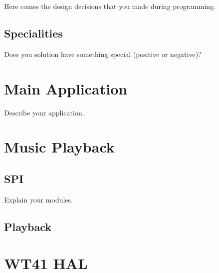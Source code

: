 \documentclass[12pt,a4paper,titlepage,oneside]{article}
\begin{document}
Here comes the design decisions that you made during programming.

\subsection{Specialities}

Does you solution have something special (positive or negative)?


\section{Main Application}

Describe your application.





\section{Music Playback}

\subsection{SPI}

Explain your modules.

\subsection{Playback}



\section{WT41 HAL}
\end{document}
